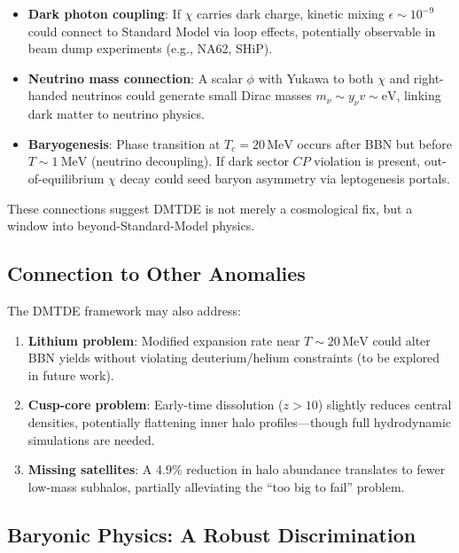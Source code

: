 \documentclass[aps,prd,twocolumn,superscriptaddress,nofootinbib,floatfix,preprintnumbers]{revtex4-2}
\begin{document}
\begin{itemize}
    \item \textbf{Dark photon coupling}: If $\chi$ carries dark charge, kinetic mixing $\epsilon \sim 10^{-9}$ could connect to Standard Model via loop effects, potentially observable in beam dump experiments (e.g., NA62, SHiP).
    \item \textbf{Neutrino mass connection}: A scalar $\phi$ with Yukawa to both $\chi$ and right-handed neutrinos could generate small Dirac masses $m_\nu \sim y_\nu v \sim \mathrm{eV}$, linking dark matter to neutrino physics.
    \item \textbf{Baryogenesis}: Phase transition at $T_c = 20\,\mathrm{MeV}$ occurs after BBN but before $T \sim \SI{1}{\MeV}$ (neutrino decoupling). If dark sector $CP$ violation is present, out-of-equilibrium $\chi$ decay could seed baryon asymmetry via leptogenesis portals.
\end{itemize}

These connections suggest DMTDE is not merely a cosmological fix, but a window into beyond-Standard-Model physics.

\subsection{Connection to Other Anomalies}
\label{subsec:anomalies}

The DMTDE framework may also address:

\begin{enumerate}
    \item \textbf{Lithium problem}: Modified expansion rate near $T \sim 20\,\mathrm{MeV}$ could alter BBN yields without violating deuterium/helium constraints (to be explored in future work).
    \item \textbf{Cusp-core problem}: Early-time dissolution ($z > 10$) slightly reduces central densities, potentially flattening inner halo profiles—though full hydrodynamic simulations are needed.
    \item \textbf{Missing satellites}: A 4.9\% reduction in halo abundance translates to fewer low-mass subhalos, partially alleviating the ``too big to fail'' problem.
\end{enumerate}

\subsection{Baryonic Physics: A Robust Discrimination}
\label{subsec:baryonic}
\end{document}
